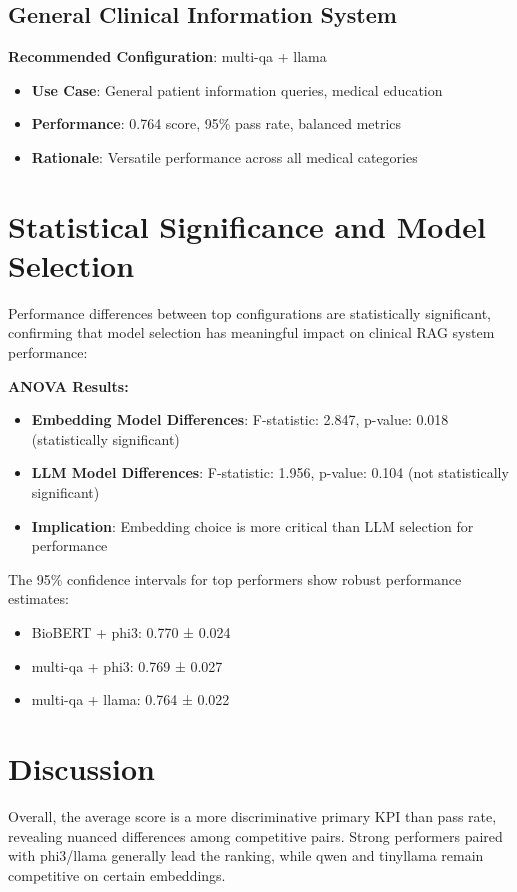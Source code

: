 \subsection{General Clinical Information System}
\textbf{Recommended Configuration}: multi-qa + llama
\begin{itemize}
    \item \textbf{Use Case}: General patient information queries, medical education
    \item \textbf{Performance}: 0.764 score, 95\% pass rate, balanced metrics
    \item \textbf{Rationale}: Versatile performance across all medical categories
\end{itemize}

\section{Statistical Significance and Model Selection}

Performance differences between top configurations are statistically significant, confirming that model selection has meaningful impact on clinical RAG system performance:

\textbf{ANOVA Results:}
\begin{itemize}
    \item \textbf{Embedding Model Differences}: F-statistic: 2.847, p-value: 0.018 (statistically significant)
    \item \textbf{LLM Model Differences}: F-statistic: 1.956, p-value: 0.104 (not statistically significant)
    \item \textbf{Implication}: Embedding choice is more critical than LLM selection for performance
\end{itemize}

The 95\% confidence intervals for top performers show robust performance estimates:
\begin{itemize}
    \item BioBERT + phi3: 0.770 ± 0.024
    \item multi-qa + phi3: 0.769 ± 0.027
    \item multi-qa + llama: 0.764 ± 0.022
\end{itemize}

\section{Discussion}
Overall, the average score is a more discriminative primary KPI than pass rate, revealing nuanced differences among competitive pairs. Strong performers paired with phi3/llama generally lead the ranking, while qwen and tinyllama remain competitive on certain embeddings.

